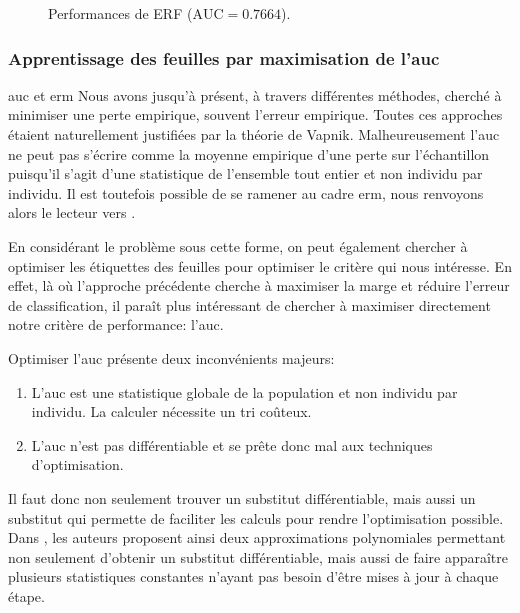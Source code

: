 \begin{figure}[htbp]
    \caption{Performances de ERF ($\mathrm{AUC} = 0.7664$).}
\end{figure}

\subsubsection{Apprentissage des feuilles par maximisation de l'\ac{auc}}

\begin{remark}{\ac{auc} et \ac{erm}}
    Nous avons jusqu'à présent, à travers différentes méthodes, cherché à minimiser une perte empirique, souvent l'erreur empirique. Toutes ces approches étaient naturellement justifiées par la théorie de Vapnik. Malheureusement l'\ac{auc} ne peut pas s'écrire comme la moyenne empirique d'une perte sur l'échantillon puisqu'il s'agit d'une statistique de l'ensemble tout entier et non individu par individu. Il est toutefois possible de se ramener au cadre \ac{erm}, nous renvoyons alors le lecteur vers \citet{Clemencon2006}.
\end{remark}


En considérant le problème sous cette forme, on peut également chercher à optimiser les étiquettes des feuilles pour optimiser le critère qui nous intéresse. En effet, là où l'approche précédente cherche à maximiser la marge et réduire l'erreur de classification, il paraît plus intéressant de chercher à maximiser directement notre critère de performance: l'\ac{auc}.

Optimiser l'\ac{auc} présente deux inconvénients majeurs:
\begin{enumerate}
    \item L'\ac{auc} est une statistique globale de la population et non individu par individu. La calculer nécessite un tri coûteux.
    \item L'\ac{auc} n'est pas différentiable et se prête donc mal aux techniques d'optimisation.
\end{enumerate}
Il faut donc non seulement trouver un substitut différentiable, mais aussi un substitut qui permette de faciliter les calculs pour rendre l'optimisation possible. 
Dans \citet{Calders2007}, les auteurs proposent ainsi deux approximations polynomiales permettant non seulement d'obtenir un substitut différentiable, mais aussi de faire apparaître plusieurs statistiques constantes n'ayant pas besoin d'être mises à jour à chaque étape.

